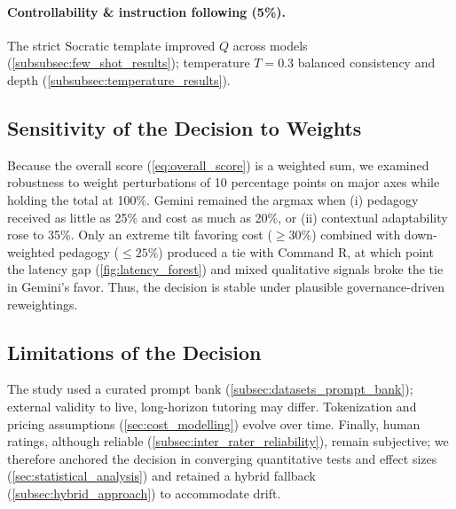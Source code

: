 \paragraph{Controllability \& instruction following (5\%).} The strict Socratic template improved $Q$ across models (\cref{subsubsec:few_shot_results}); temperature $T=0.3$ balanced consistency and depth (\cref{subsubsec:temperature_results}).

\subsection{Sensitivity of the Decision to Weights}
\label{subsec:decision_sensitivity}

Because the overall score (\cref{eq:overall_score}) is a weighted sum, we examined robustness to weight perturbations of \textpm{}10 percentage points on major axes while holding the total at 100\%. Gemini remained the argmax when (i) pedagogy received as little as 25\% and cost as much as 20\%, or (ii) contextual adaptability rose to 35\%. Only an extreme tilt favoring cost ($\geq 30\%$) combined with down-weighted pedagogy ($\leq 25\%$) produced a tie with Command R, at which point the latency gap (\cref{fig:latency_forest}) and mixed qualitative signals broke the tie in Gemini's favor. Thus, the decision is stable under plausible governance-driven reweightings.

\subsection{Limitations of the Decision}
\label{subsec:decision_limitations}

The study used a curated prompt bank (\cref{subsec:datasets_prompt_bank}); external validity to live, long-horizon tutoring may differ. Tokenization and pricing assumptions (\cref{sec:cost_modelling}) evolve over time. Finally, human ratings, although reliable (\cref{subsec:inter_rater_reliability}), remain subjective; we therefore anchored the decision in converging quantitative tests and effect sizes (\cref{sec:statistical_analysis}) and retained a hybrid fallback (\cref{subsec:hybrid_approach}) to accommodate drift.

